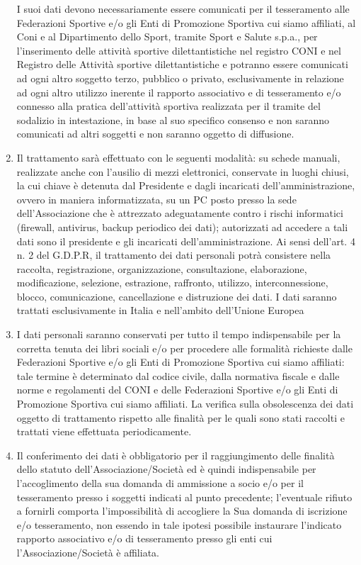 \documentclass[
	headerstyle = TitleDojoFijlkam
]{djtsmod}
\begin{document}
\begin{enumerate}[wide, labelindent = 0pt, noitemsep, topsep = 0pt]
		I suoi dati devono necessariamente essere comunicati per il tesseramento alle Federazioni Sportive e/o gli Enti di Promozione Sportiva cui siamo affiliati, al Coni e al Dipartimento dello Sport, tramite Sport e Salute s.p.a., per l'inserimento delle attività sportive dilettantistiche nel registro CONI e nel Registro delle Attività sportive dilettantistiche e potranno essere comunicati ad ogni altro soggetto terzo, pubblico o privato, esclusivamente in relazione ad ogni altro utilizzo inerente il rapporto associativo e di tesseramento e/o connesso alla pratica dell'attività sportiva realizzata per il tramite del sodalizio in intestazione,  in base al suo specifico consenso e non saranno comunicati ad altri soggetti e non saranno oggetto di diffusione.
		\item Il trattamento sarà effettuato con le seguenti modalità: su schede manuali, realizzate anche con l'ausilio di mezzi elettronici, conservate in luoghi chiusi, la cui chiave è detenuta dal Presidente e dagli incaricati dell'amministrazione, ovvero in maniera informatizzata, su un PC posto presso la sede dell'Associazione che è attrezzato adeguatamente contro i rischi informatici (firewall, antivirus, backup periodico dei dati); autorizzati ad accedere a tali dati sono il presidente e gli incaricati dell'amministrazione. Ai sensi dell'art. 4 n. 2 del G.D.P.R, il trattamento dei dati personali potrà consistere nella raccolta, registrazione, organizzazione, consultazione, elaborazione, modificazione, selezione, estrazione, raffronto, utilizzo, interconnessione, blocco, comunicazione, cancellazione e distruzione dei dati. I dati saranno trattati esclusivamente in Italia e nell'ambito dell'Unione Europea
		\item I dati personali saranno conservati per tutto il tempo indispensabile per la corretta tenuta dei libri sociali e/o per procedere alle formalità richieste dalle Federazioni Sportive e/o gli Enti di Promozione Sportiva cui siamo affiliati: tale termine è determinato dal codice civile, dalla normativa fiscale e dalle norme e regolamenti del CONI e delle Federazioni Sportive e/o gli Enti di Promozione Sportiva cui siamo affiliati. La verifica sulla obsolescenza dei dati oggetto di trattamento rispetto alle finalità per le quali sono stati raccolti e trattati viene effettuata periodicamente.
		\item Il conferimento dei dati è obbligatorio per il raggiungimento delle finalità dello statuto dell'Associazione/Società ed è quindi indispensabile per l'accoglimento della sua domanda di ammissione a socio e/o per il tesseramento presso i soggetti indicati al punto precedente; l'eventuale rifiuto a fornirli comporta  l'impossibilità di accogliere la Sua domanda di iscrizione e/o tesseramento, non essendo in tale ipotesi possibile instaurare l'indicato rapporto associativo e/o di tesseramento presso gli enti cui l'Associazione/Società è affiliata.

\end{enumerate}
\end{document}
